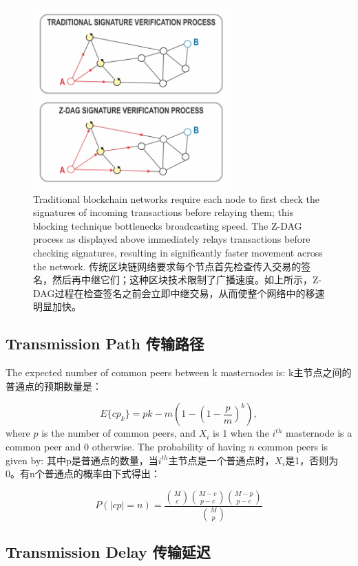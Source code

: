 \documentclass{ctexart}
\begin{document}
\begin{figure}[h!]
\centering
\includegraphics[width=3in]{img/dag_tx.png}
\caption{Traditional blockchain networks require each node to first check the signatures of incoming transactions before relaying them; this blocking technique bottlenecks broadcasting speed. The Z-DAG process as displayed above immediately relays transactions before checking signatures, resulting in significantly faster movement across the network. 传统区块链网络要求每个节点首先检查传入交易的签名，然后再中继它们；这种区块技术限制了广播速度。如上所示，Z-DAG过程在检查签名之前会立即中继交易，从而使整个网络中的移速明显加快。} 
\label{fig:dag_tx}
\end{figure} 


\subsection{Transmission Path 传输路径 }

The expected number of common peers between k masternodes is:
k主节点之间的普通点的预期数量是：

\begin{equation}
E\{cp_{k}\} = pk -m \left(1 - \left(1 - \frac{p}{m}\right)^{k}\right),
\end{equation}
where $p$ is the number of common peers, and $X_{i}$ is 1 when the $i^{th}$ masternode is a common peer and 0 otherwise. The probability of having $n$ common peers is given by: 
其中p是普通点的数量，当$i^{th}$主节点是一个普通点时，$X_{i}$是1，否则为0。有n个普通点的概率由下式得出：

\begin{equation}
P(|cp| = n) = \frac{\binom{M}{c} \binom{M-c}{p-c} \binom{M-p}{p-c} }{\binom{M}{p}}
\end{equation}

\subsection{Transmission Delay 传输延迟}
\end{document}
